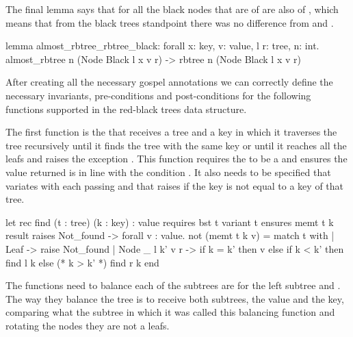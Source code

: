 The final lemma  says that for all the black nodes that are  of
 are also  of , which means that from the black trees standpoint there was no difference from
 and .

\begin{whylang}
    lemma almost_rbtree_rbtree_black:
        forall x: key, v: value, l r: tree, n: int.
        almost_rbtree n (Node Black l x v r) -> rbtree n (Node Black l x v r)
\end{whylang}

After creating all the necessary gospel annotations we can correctly define the necessary invariants, pre-conditions and post-conditions for the
following functions supported in the red-black trees data structure.

The first function is the  that receives a tree  and a key  in which it traverses the tree recursively
until it finds the tree with the same key or until it reaches all the leafs and raises the exception . This function requires
the  to be a  and ensures the value returned is in line with the condition . It also needs to be specified
that  variates with each passing and that raises  if the key is not equal to a key of that tree.

\begin{whylang}
    let rec find (t : tree) (k : key) : value
        requires { bst t }
        variant { t }
        ensures { memt t k result }
        raises { Not_found -> forall v : value. not (memt t k v) }
    = match t with
        | Leaf -> raise Not_found
        | Node _ l k' v r ->
            if k = k' then v
            else if k < k' then find l k
            else (* k > k' *) find r k
        end
\end{whylang}

The functions need to balance each of the subtrees are  for the left subtree and . The way they balance
the tree is to receive both subtrees, the value and the key, comparing what the subtree in which it was called this balancing function and rotating
the nodes they are not a leafs. 

